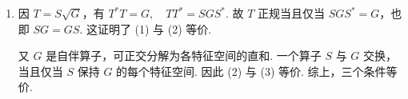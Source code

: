 \begin{enumerate}
\begin{enumerate}
        \item 假. 例如 $A=\begin{pmatrix}0&-1\\1&0\end{pmatrix}$ 是复正规矩阵，但其实部矩阵就是 $A$，并非对称矩阵.
    \end{enumerate}

    \item 因 $T=S\sqrt{G}$，有 $T^*T=G,\quad TT^*=S G S^*$. 故 $T$ 正规当且仅当 $S G S^*=G$，也即 $SG=GS$. 这证明了 (1) 与 (2) 等价.

    又 $G$ 是自伴算子，可正交分解为各特征空间的直和. 一个算子 $S$ 与 $G$ 交换，当且仅当 $S$ 保持 $G$ 的每个特征空间. 因此 (2) 与 (3) 等价. 综上，三个条件等价.
\end{enumerate}

\clearpage
